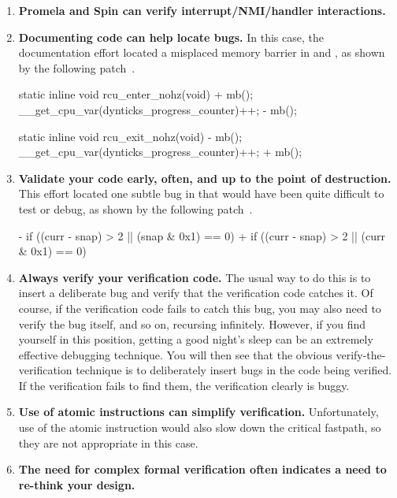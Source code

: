 \begin{enumerate}
\item	{\bf Promela and Spin can verify interrupt\slash NMI\-/handler
	interactions.}
\item	{\bf Documenting code can help locate bugs.}
	In this case, the documentation effort located
	a misplaced memory barrier in
	 and ,
	as shown by the following patch~\cite{PaulEMcKenney2008commit:d7c0651390b6}.

\begin{VerbatimU}
 static inline void rcu_enter_nohz(void)
 {
+       mb();
        __get_cpu_var(dynticks_progress_counter)++;
-       mb();
 }

 static inline void rcu_exit_nohz(void)
 {
-       mb();
        __get_cpu_var(dynticks_progress_counter)++;
+       mb();
 }
\end{VerbatimU}

\item	{\bf Validate your code early, often, and up to the point
	of destruction.}
	This effort located one subtle bug in
	that would have been quite difficult to test or debug, as
	shown by the following patch~\cite{PaulEMcKenney2008commit:ae66be9b71b1}.

\begin{VerbatimU}
-       if ((curr - snap) > 2 || (snap & 0x1) == 0)
+       if ((curr - snap) > 2 || (curr & 0x1) == 0)
\end{VerbatimU}

\item	{\bf Always verify your verification code.}
	The usual way to do this is to insert a deliberate bug
	and verify that the verification code catches it.  Of course,
	if the verification code fails to catch this bug, you may also
	need to verify the bug itself, and so on, recursing infinitely.
	However, if you find yourself in this position,
	getting a good night's sleep
	can be an extremely effective debugging technique.
	You will then see that the obvious verify-the-verification
	technique is to deliberately insert bugs in the code being
	verified.
	If the verification fails to find them, the verification clearly
	is buggy.
\item	{\bf Use of atomic instructions can simplify verification.}
	Unfortunately, use of the  atomic instruction
	would also slow down the critical  fastpath, so they
	are not appropriate in this case.
\item	{\bf The need for complex formal verification often indicates
	a need to re-think your design.}
\end{enumerate}

